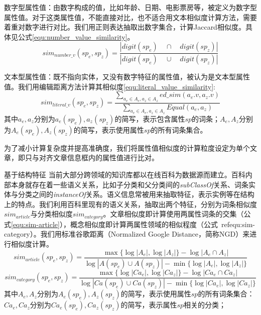 数字型属性值：由数字构成的值，比如年龄、日期、电影票房等，被定义为数字型属性值。对于这类属性值，不能直接对比，也不适合用文本相似度计算方法，需要着重对数字进行对比。我们用正则表达抽取出数字集合，计算Jaccard相似度。具体见公式\ref{equ:number_value_similarity}。
\begin{equation}
\label{equ:number_value_similarity}
sim_{number\_v}(sp_e, sp_z) = \frac { |digit(sp_e)\quad \cap \quad digit(sp_z)| }{ |digit(sp_e)\quad \cup \quad digit(sp_z)| } 
\end{equation}

文本型属性值：既不指向实体，又没有数字特征的属性值，被认为是文本型属性值。我们用编辑距离方法计算其相似度\ref{equ:literal_value_similarity}:
\begin{equation}
\label{equ:literal_value_similarity}
sim_{literal\_v}(sp_e, sp_z) = \frac { \sum _{ { a }_{ e }\in { A }_{ e },{ a }_{ z }\in { A }_{ z } }{ ed\_ sim\left( { a }_{ e }.v,{ a }_{ z }.v \right)  }  }{ \sum _{ { a }_{ e }\in { A }_{ e },{ a }_{ z }\in { A }_{ z } }{ Equal\left( { a }_{ e },{ a }_{ z } \right)  }  }
\end{equation}
其中$a_e, a_z$分别为$a_e(sp_e), a_z(sp_z)$的简写，表示包含属性$sp$的词条；$A_e, A_z$分别为$A_e(sp_e),A_z(sp_z)$的简写，表示使用属性$sp$的所有词条集合。

为了减小计算复杂度并提高准确度，我们将属性值相似度的计算粒度设定为单个文章，即只与对齐文章信息框内的属性值进行比对。

{\heiti 基于结构特征}
当前大部分跨领域的知识库都以在线百科为数据源而建立。百科内部本身就存在着一些语义关系，比如子分类和父分类间的\textit{subClassOf}关系、词条实体与分类之间的\textit{instanceOf}关系。语义信息常被用来抽取特征\cite{wang2014cross}，表示实例等在结构上的特点。我们利用百科里现有的语义关系，抽取出两个特征，分别为词条相似度$sim_{article}$与分类相似度$sim_{category}$。文章相似度即计算使用两属性词条的交集（公式\ref{equ:sim-article}），概念相似度即计算两属性领域的相似程度（公式\ ref{equ:sim-category}）。我们用标准谷歌距离（Normalized Google Distance，简称NGD）来进行相似度计算。
\begin{equation}
\label{equ:sim-article}
sim_{article}(sp_e, sp_z) = \frac{\max\{\log |A_e|, \log |A_z|\} - \log|A_e \cap A_z|}
{\log |A(sp_e) \cup A(sp_z)| - \min\{\log |A_e|, \log |A_z|\}}
\end{equation}
\begin{equation}
\label{equ:sim-category}
sim_{category}(sp_e, sp_z) = \frac{\max\{\log |Ca_e|, \log |Ca_z|\} - \log|Ca_e \cap Ca_z|}
{\log |Ca(sp_e) \cup Ca(sp_z)| - \min\{\log |Ca_e|, \log |Ca_z|\}}
\end{equation}
其中$A_e, A_z$分别为$A_e(sp_e),A_z(sp_z)$的简写，表示使用属性$sp$的所有词条集合：$Ca_e, Ca_z$分别为$Ca_e(sp_e), Ca_z(sp_z)$的简写，表示属性$sp$相关的分类；

